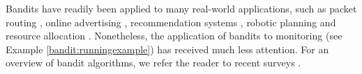 

Bandits have readily been applied to many real-world applications, such as packet routing \cite{DBLP:conf/stoc/AwerbuchK04}, online advertising \cite{DBLP:conf/nips/ChakrabartiKRU08}, recommendation systems \cite{DBLP:conf/www/LiCLS10}, robotic planning \cite{DBLP:conf/cdc/SrivastavaRL14} and resource allocation \cite{DBLP:journals/pvldb/LiZLWZ18}. 
Nonetheless, the application of bandits to monitoring (see Example \ref{bandit:runningexample}) has received much less attention.
For an overview of bandit algorithms, we refer the reader to recent surveys \cite{DBLP:journals/ftml/BubeckC12, DBLP:journals/corr/BurtiniLL15, lattimore18}.   

